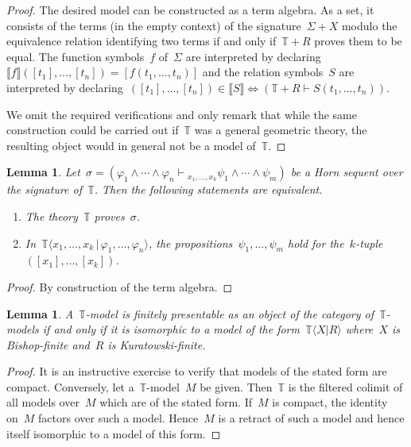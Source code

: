 \documentclass[oneside,reqno]{amsart}
\theoremstyle{definition}
\theoremstyle{plain}
\newtheorem{lemma}[defn]{Lemma}
\theoremstyle{remark}
\newcommand{\TT}{\mathbb{T}}
\renewcommand{\_}{\mathpunct{.}\,}
\newcommand{\?}{\,{:}\,}
\newcommand{\brak}[1]{\llbracket #1 \rrbracket}
\newcommand{\seq}[1]{\mathrel{\vdash\!\!\!_{#1}}}
\begin{document}
\begin{proof}The desired model can be constructed as a term algebra. As a set,
it consists of the terms (in the empty context) of the signature~$\Sigma + X$
modulo the equivalence relation identifying two terms if and only if~$\TT + R$
proves them to be equal. The function symbols~$f$ of~$\Sigma$ are interpreted
by declaring~$\brak{f}([t_1],\ldots,[t_n]) = [f(t_1,\ldots,t_n)]$ and the
relation symbols~$S$ are interpreted by declaring~$([t_1],\ldots,[t_n]) \in
\brak{S} \Leftrightarrow (\TT + R \vdash S(t_1,\ldots,t_n))$.

We omit the required verifications and only remark that while the same
construction could be carried out if~$\TT$ was a general geometric theory, the
resulting object would in general not be a model of~$\TT$.
\end{proof}

\begin{lemma}Let~$\sigma = (\varphi_1 \wedge \cdots \wedge \varphi_n
\seq{x_1,\ldots,x_k} \psi_1 \wedge \cdots \wedge \psi_m)$ be a Horn sequent
over the signature of~$\TT$. Then the following statements are equivalent.
\begin{enumerate}
\item The theory~$\TT$ proves~$\sigma$. \smallskip
\item In~$\TT\langle x_1,\ldots,x_k \,|\, \varphi_1,\ldots,\varphi_n \rangle$, the
propositions~$\psi_1,\ldots,\psi_m$ hold for
the~$k$-tuple~$([x_1],\ldots,[x_k])$.
\end{enumerate}
\end{lemma}

\begin{proof}By construction of the term algebra.\end{proof}

\begin{lemma}\label{lemma:char-fp-models}
A~$\TT$-model is finitely presentable as an object of the category
of~$\TT$-models if and only if it is isomorphic to a model of the
form~$\TT\langle X | R \rangle$ where~$X$ is Bishop-finite and~$R$ is
Kuratowski-finite.
\end{lemma}

\begin{proof}It is an instructive exercise to verify that models of the stated
form are compact. Conversely, let a~$\TT$-model~$M$ be given. Then~$\TT$ is the
filtered colimit of all models over~$M$ which are of the stated form. If~$M$ is
compact, the identity on~$M$ factors over such a model. Hence~$M$ is a
retract of such a model and hence itself isomorphic to a model of this form.
\end{proof}
\end{document}
